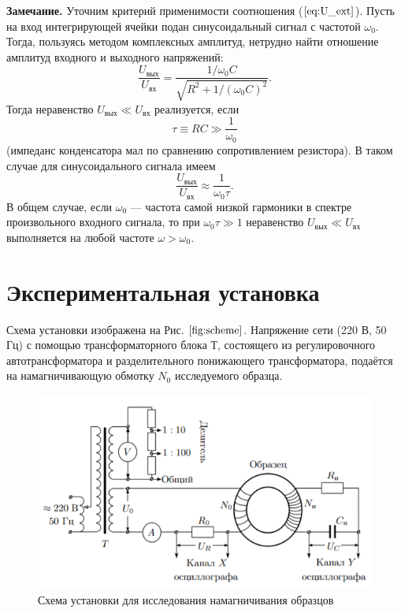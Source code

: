 \documentclass[a4paper, 12pt]{article}
\begin{document}
\textbf{Замечание.} Уточним критерий применимости соотношения ($\ref{eq:U_ext}$). Пусть на вход интегрирующей ячейки подан синусоидальный сигнал с частотой $\omega_0$. Тогда, пользуясь методом комплексных амплитуд, нетрудно найти отношение амплитуд входного и выходного напряжений:
\begin{equation}
    \frac{U_{вых}}{U_{вх}}=\frac{1/\omega_0C}{\sqrt{R^2+1/(\omega_0C)^2}}.
\end{equation}
Тогда неравенство $U_{вых} \ll U_{вх}$ реализуется, если 
\begin{equation}
    \tau \equiv RC\gg \frac{1}{\omega_0}
\end{equation}
(импеданс конденсатора мал по сравнению сопротивлением резистора).
В таком случае для синусоидального сигнала имеем
\begin{equation}
    \frac{U_{вых}}{U_{вх}}\approx\frac{1}{\omega_0\tau}.
\end{equation}
В общем случае, если $\omega_0$ — частота самой низкой гармоники в спектре
произвольного входного сигнала, то при $\omega_0\tau \gg 1$ неравенство $U_{вых} \ll U_{вх}$ выполняется на любой частоте $\omega > \omega_0$.

\section{Экспериментальная установка}
Схема установки изображена на Рис. $\ref{fig:scheme}$. Напряжение сети (220 В,
50 Гц) с помощью трансформаторного блока Т, состоящего из регулировочного автотрансформатора и разделительного понижающего трансформатора, подаётся на намагничивающую обмотку $N_0$ исследуемого образца.
\begin{figure}[h!]
    \centering
    \includegraphics{scheme.png}
    \caption{ Схема установки для исследования намагничивания образцов}
    \label{fig:scheme}
\end{figure}
\end{document}
